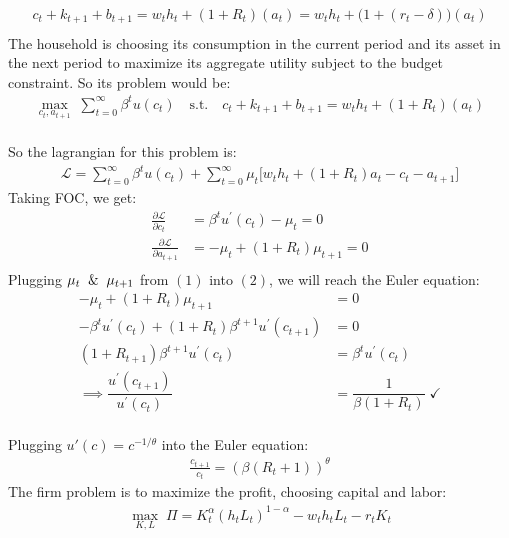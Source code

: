 \documentclass[12pt]{extarticle}
\newcommand{\rond}[2]{\frac{\partial #1}{\partial #2}}
\begin{document}
\begin{align*}
    c_t + k_{t+1} + b_{t+1} = w_t h_t + (1 + R_t) (a_t) = w_t h_t + \bigl(1 + (r_t-\delta)\bigr) (a_t)\\
\end{align*}
The household is choosing its consumption in the current period and its asset in the next period to maximize its aggregate utility subject to the budget constraint.
So its problem would be:
\begin{align*}
    \max_{c_t, a_{t+1}} \; \sum_{t=0}^{\infty} \beta^{t} u(c_t) \quad \text{s.t.} \quad
    c_t + k_{t+1} + b_{t+1} = w_t h_t + (1 + R_t) (a_t)
\end{align*}\\
So the lagrangian for this problem is:
\begin{align*}
    \mathcal{L} = \sum_{t=0}^{\infty} \beta^{t} u(c_t)
    + \sum_{t=0}^{\infty} \mu_t \biggl[w_th_t + (1 + R_t) a_t - c_t - a_{t+1}\biggr]
\end{align*}
Taking FOC, we get:
\begin{align*}
    \rond{\mathcal{L}}{c_t} &= \beta^t u^\prime(c_t) - \mu_t = 0 \tag{1}\\
    \rond{\mathcal{L}}{a_{t+1}} &= -\mu_t + (1+R_t)\mu_{t+1} = 0 \tag{2}\\
\end{align*}
Plugging $\mu_{t} \And \mu_{t+1}$ from $(1)$ into $(2)$,
we will reach the Euler equation:
\begin{align*}
   -\mu_t + (1+R_t)\mu_{t+1} & = 0 \\
   -\beta^{t} u^\prime(c_{t}) + (1+R_{t})\beta^{t+1} u^\prime(c_{t+1}) & = 0 \\
    (1+R_{t+1})\beta^{t+1} u^\prime(c_{t}) & = \beta^{t} u^\prime(c_{t}) \\
    \implies\dfrac{u^\prime(c_{t+1}) }{u^\prime(c_t)} &= \dfrac{1}{\beta (1 + R_{t})}\; \checkmark
\end{align*}\\
Plugging  $u'(c) = c^{-1/\theta}$ into the Euler equation:
\begin{align*}
    \frac{c_{t+1}}{c_t} = (\beta (R_t+1))^{\theta}
\end{align*}
\newpage
The firm problem is to maximize the profit, choosing capital and labor:
\begin{align*}
    \max_{K, L} \; \Pi = K_t^{\alpha} (h_t L_t)^{1-\alpha} - w_th_tL_t - r_tK_t
\end{align*}\\
\end{document}
